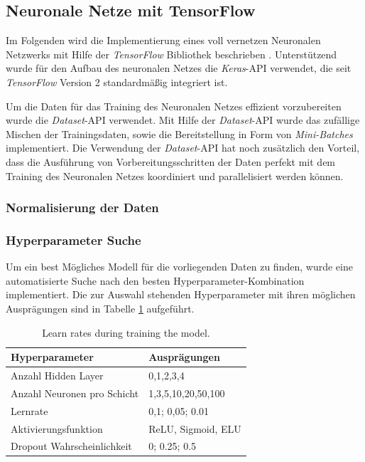 \subsection{Neuronale Netze mit TensorFlow}
Im Folgenden wird die Implementierung eines voll vernetzen Neuronalen Netzwerks mit Hilfe der \emph{TensorFlow} Bibliothek beschrieben \cite{tensorflow2015-whitepaper}. Unterstützend wurde für den Aufbau des neuronalen Netzes die \emph{Keras}-API verwendet, die seit \emph{TensorFlow} Version 2 standardmäßig integriert ist. 

Um die Daten für das Training des Neuronalen Netzes effizient vorzubereiten wurde die \emph{Dataset}-API verwendet. Mit Hilfe der \emph{Dataset}-API wurde das zufällige Mischen der Trainingsdaten, sowie die Bereitstellung in Form von \emph{Mini-Batches} implementiert. Die Verwendung der \emph{Dataset}-API hat noch zusätzlich den Vorteil, dass die Ausführung von Vorbereitungsschritten der Daten perfekt mit dem Training des Neuronalen Netzes koordiniert und parallelisiert werden können.

\subsubsection{Normalisierung der Daten}

\subsubsection{Hyperparameter Suche}
Um ein best Mögliches Modell für die vorliegenden Daten zu finden, wurde eine automatisierte Suche nach den besten Hyperparameter-Kombination implementiert. Die zur Auswahl stehenden Hyperparameter mit ihren möglichen Ausprägungen sind in Tabelle \ref{table:hyper} aufgeführt.

\begin{table}[h]
	\centering
	\begin{tabular}{ll}
		\textbf{Hyperparameter}     & \textbf{Ausprägungen} \\ \hline
		Anzahl Hidden Layer         & 0,1,2,3,4             \\
		Anzahl Neuronen pro Schicht & 1,3,5,10,20,50,100    \\
		Lernrate                    & 0,1;  0,05;  0.01     \\
		Aktivierungsfunktion        & ReLU, Sigmoid, ELU \\
		Dropout Wahrscheinlichkeit  & 0;  0.25;  0.5       
	\end{tabular}
	\caption{\label{table:hyper}Learn rates during training the model.}
\end{table}

